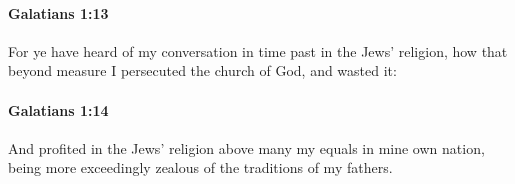 		\paragraph{Galatians 1:13} %
			\label{GALATIANS-1-13}

			For ye have heard of my conversation in time past in the Jews' religion, how that beyond measure I persecuted the church of God, and wasted it:

			\begin{framed}
			\scriptsize
				\begin{compactdesc}
					\item[SBLG] 
				\end{compactdesc}
			\end{framed}

		\paragraph{Galatians 1:14} %
			\label{GALATIANS-1-14}

			And profited in the Jews' religion above many my equals in mine own nation, being more exceedingly zealous of the traditions of my fathers.

